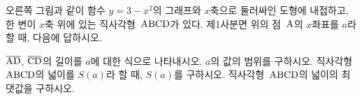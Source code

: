 \noindent\begin{minipage}[t]{0.58\linewidth}\vspace{0pt}\raggedright 오른쪽 그림과 같이 함수 $y=3-x^2$의 그래프와 $x$축으로 둘러싸인 도형에 내접하고, 한 변이 $x$축 위에 있는 직사각형~$\mathrm{ABCD}$가 있다. 제1사분면 위의 점~$\mathrm{A}$의 $x$좌표를 $a$라 할 때, 다음에 답하시오.\end{minipage}\hfill\begin{minipage}[t]{0.4\linewidth}\vspace{0pt}\centering \resizebox{\ifdim\width>\linewidth\linewidth\else\width\fi}{!}{}\end{minipage}\par
{} $\overline{\mathrm{AD}}$, $\overline{\mathrm{CD}}$의 길이를 $a$에 대한 식으로 나타내시오.
 $a$의 값의 범위를 구하시오.
 직사각형~$\mathrm{ABCD}$의 넓이를 $S(a)$라 할 때, $S(a)$를 구하시오.
 직사각형~$\mathrm{ABCD}$의 넓이의 최댓값을 구하시오.
